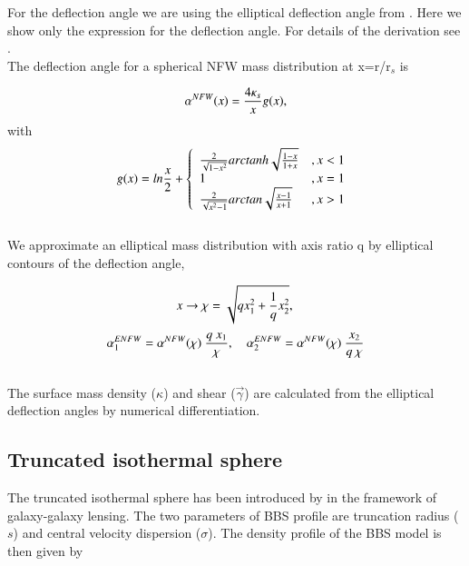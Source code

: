 \documentclass[useAMS,usenatbib]{mn2e}
\newcounter{two}   \setcounter{two}{2}
\begin{document}
For the deflection angle we are using the elliptical deflection angle
from \citet{meneghetti:03}. Here we show only the expression for the
deflection angle. For details of the derivation see
\citet{meneghetti:03}.\\

The deflection angle for a spherical NFW mass distribution at
x=r/r$_s$ is

\begin{equation}
  \alpha^{NFW}(x) = {4\kappa_{s}\over x}g(x),
\end{equation}
with
\begin{equation}
  g(x) = ln{x\over2}+\left\{ \begin{array}{lr}
    {2\over\sqrt{1 - x^2}} arctanh\sqrt{1-x\over 1+x} & ,x<1 \\
    1 & ,x=1 \\
    {2\over\sqrt{x^2 - 1}} arctan\sqrt{x-1\over x+1} & ,x>1 \\
  \end{array} \right .\\
\end{equation}\\

We approximate an elliptical mass distribution with axis ratio q by
elliptical contours of the deflection angle,

\begin{equation}
  x\rightarrow \chi=\sqrt{q x_1^2+{1\over q} x_2^2},\\
\end{equation}
\begin{equation}
  \alpha^{ENFW}_{1}=\alpha^{NFW}(\chi)\ {q\ x_1 \over \chi},\quad
  \alpha^{ENFW}_{2}=\alpha^{NFW}(\chi)\ {x_2 \over q\ \chi}\\
\end{equation}\\

The surface mass density ($\kappa$) and shear ($\vec{\gamma}$) are
calculated from the elliptical deflection angles by numerical
differentiation.


\subsection{Truncated isothermal sphere}
  
The truncated isothermal sphere has been introduced by
\citet{brainerd:96} in the framework of galaxy-galaxy lensing. The two
parameters of BBS profile are truncation radius ($s$) and central
velocity dispersion ($\sigma$). The density profile of the BBS model
is then given by
\end{document}
